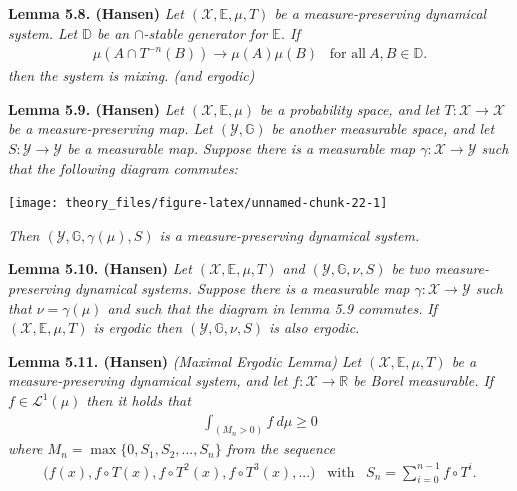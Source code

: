 \documentclass[a4paper,12pt,openany]{book}
\begin{document}
\textbf{Lemma 5.8. (Hansen)} \emph{Let \((\mathcal{X},\mathbb{E},\mu,T)\) be a measure-preserving dynamical system. Let \(\mathbb{D}\) be an \(\cap\)-stable generator for \(\mathbb{E}\). If}
\begin{align*}
        \mu(A\cap T^{-n}(B))\to \mu(A)\mu(B)\hspace{10pt}\text{for all}\ A,B\in\mathbb{D}.\tag{5.10}
\end{align*}
\emph{then the system is mixing. (and ergodic)}

\textbf{Lemma 5.9. (Hansen)} \emph{Let \((\mathcal{X},\mathbb{E},\mu)\) be a probability space, and let \(T : \mathcal{X}\to \mathcal{X}\) be a measure-preserving map. Let \((\mathcal{Y},\mathbb{G})\) be another measurable space, and let \(S : \mathcal{Y} \to \mathcal{Y}\) be a measurable map.}
\emph{Suppose there is a measurable map \(\gamma : \mathcal{X}\to \mathcal{Y}\) such that the following diagram commutes:}

\begin{center}\texttt{[image: theory\_files/figure-latex/unnamed-chunk-22-1]} \end{center}

\emph{Then \((\mathcal{Y},\mathbb{G},\gamma(\mu),S)\) is a measure-preserving dynamical system.}

\textbf{Lemma 5.10. (Hansen)} \emph{Let \((\mathcal{X},\mathbb{E},\mu,T)\) and \((\mathcal{Y},\mathbb{G},\nu,S)\) be two measure-preserving dynamical systems. Suppose there is a measurable map \(\gamma : \mathcal{X}\to\mathcal{Y}\) such that \(\nu =\gamma(\mu)\) and such that the diagram in lemma 5.9 commutes.}
\emph{If \((\mathcal{X},\mathbb{E},\mu,T)\) is ergodic then \((\mathcal{Y},\mathbb{G},\nu,S)\) is also ergodic.}

\textbf{Lemma 5.11. (Hansen)} \emph{(Maximal Ergodic Lemma) Let \((\mathcal{X},\mathbb{E},\mu,T)\) be a measure-preserving dynamical system, and let \(f : \mathcal{X}\to \mathbb{R}\) be Borel measurable. If \(f\in \mathcal{L}^1(\mu)\) then it holds that}
\begin{align*}
    \int_{(M_n>0)}f\ d\mu\ge 0\tag{5.14}
\end{align*}
\emph{where \(M_n=\max\{0,S_1,S_2,...,S_n\}\) from the sequence}
\begin{align*}
    \Big(f(x), f\circ T(x),f\circ T^2(x),f\circ T^3(x),...\Big)\hspace{10pt}\text{with}\hspace{10pt}S_n=\sum_{i=0}^{n-1}f\circ T^i.
\end{align*}
\end{document}
